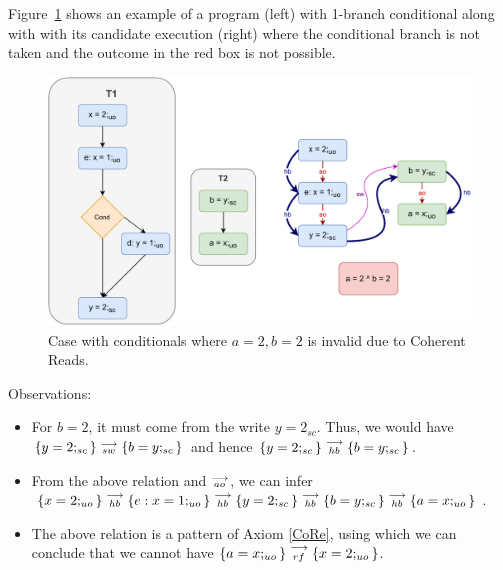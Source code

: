     Figure~\ref{reord:cond_counter_example2(a)} shows an example of a program (left) with 1-branch conditional along with with its candidate execution (right) where the conditional branch is not taken and the outcome in the red box is not possible. 
    \begin{figure}[H]
        \centering 
        \includegraphics[scale=0.7]{7.CounterExamples/ReorderingConditionals/CounterExamples2a(Conditionals).pdf}
        \caption{Case with conditionals where $a = 2, b = 2$ is invalid due to Coherent Reads.}
        \label{reord:cond_counter_example2(a)}
    \end{figure}
    
    Observations:
    \begin{itemize}
        \item For $b=2$, it must come from the write $y=2_{sc}$. 
        Thus, we would have $\{y=2;_{sc}\}\stackrel{\longrightarrow}{_{sw}}\{b=y;_{sc}\}$ and hence $\{y=2;_{sc}\}\stackrel{\longrightarrow}{_{hb}}\{b=y;_{sc}\}$.
        \item From the above relation and $\stackrel{\longrightarrow}{_{ao}}$, we can infer $\{x=2;_{uo}\}\stackrel{\longrightarrow}{_{hb}}\{e: x=1;_{uo}\}\stackrel{\longrightarrow}{_{hb}}\{y=2;_{sc}\}\stackrel{\longrightarrow}{_{hb}}\{b=y;_{sc}\}\stackrel{\longrightarrow}{_{hb}}\{a=x;_{uo}\}$.
        \item The above relation is a pattern of Axiom \ref{CoRe}, using which we can conclude that we cannot have $\{a=x;_{uo}\}\stackrel{\longrightarrow}{_{rf}}\{x=2;_{uo}\}$.
    \end{itemize}
    
